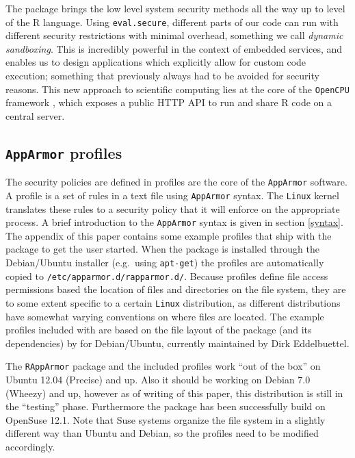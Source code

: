 \documentclass[article]{jss}
\newcommand{\R}{\textsf{R}\xspace}
\newcommand{\AppArmor}{\texttt{AppArmor}\xspace}
\newcommand{\RAppArmor}{\pkg{RAppArmor}\xspace}
\newcommand{\Linux}{\texttt{Linux}\xspace}
\begin{document}
The \RAppArmor package brings the low level system security methods all the way
up to level of the \R language. Using \texttt{eval.secure}, different parts of
our code can run with different security restrictions with minimal overhead,
something we call \emph{dynamic sandboxing}. This is incredibly powerful in the
context of embedded services, and enables us to design applications which
explicitly allow for custom code execution; something that previously always had
to be avoided for security reasons. This new approach to scientific computing lies
at the core of the \texttt{OpenCPU} framework \citep{opencpu}, which exposes a
public HTTP API to run and share \R code on a central server.

\subsection[AppArmor profiles]{\AppArmor profiles}

The security policies are defined in profiles are the core of the \AppArmor
software. A profile is a set of rules in a text file using \AppArmor syntax. The
\Linux kernel translates these rules to a security policy that it will enforce
on the appropriate process. A brief introduction to the \AppArmor syntax is
given in section \ref{syntax}. The appendix of this paper contains some example
profiles that ship with the \RAppArmor package to get the user started.
When the package is installed through the Debian/Ubuntu installer (e.g.\ using
\texttt{apt-get}) the profiles are automatically copied to
\texttt{/etc/apparmor.d/rapparmor.d/}. Because profiles define file access
permissions based the location of files and directories on the file system,
they are to some extent specific to a certain \Linux distribution, as different
distributions have somewhat varying conventions on where files are located. The
example profiles included with \RAppArmor are based on the file layout of
the  package (and its dependencies) by \cite{batesusing} for
Debian/Ubuntu, currently maintained by Dirk Eddelbuettel.

The \texttt{RAppArmor} package and the included profiles work ``out of the
box'' on Ubuntu 12.04 (Precise) and up. Also it should be working on Debian
7.0 (Wheezy) and up, however as of writing of this paper, this distribution is
still in the ``testing'' phase. Furthermore the package has been successfully
build on OpenSuse 12.1. Note that Suse systems organize the file system in a
slightly different way than Ubuntu and Debian, so the profiles need to be
modified accordingly.
\end{document}
